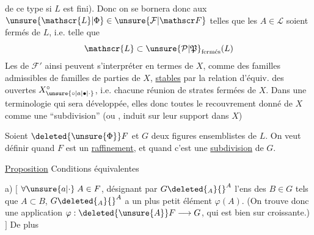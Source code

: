 de ce type si $L$ est fini). Donc on se bornera donc aux $\unsure{\mathscr{L}|\Phi}\in\unsure{\mathcal F|\mathscr F}$ telles que les $A\in\mathscr{L}$ soient fermés de $L$, i.e. telle que
\[ \mathscr{L}\subset\unsure{\mathcal P|\mathfrak P}_{\text{fermés}}(L) \]
Les  de $\mathcal F'$ ainsi  peuvent s'interpréter en termes de $X$, comme des familles admissibles  de familles de
parties  de $X$,  \uline{stables} par la relation d'équiv. des   ouvertes $X_{\unsure{\circ|a|\bullet|\cdot}}^\circ$, i.e. chacune réunion de strates fermées de $X$.
Dans une terminologie qui sera développée, elles  donc toutes le recouvrement donné de $X$ comme une ``subdivision''\unsure{;|,} (ou ,  induit sur leur support dans $X$)


Soient $\deleted{\unsure{\Phi}}F$ et $G$ deux figures ensemblistes de $L$. On veut définir quand $F$ est un \uline{raffinement}, et quand c'est une \uline{subdivision} de $G$.

\uline{Proposition} Conditions équivalentes

a) $[$ $\forall\unsure{a|\cdot}\;A\in F$, désignant par $G\deleted{{}_A}{}^A$ l'ens des $B\in G$ tels que $A\subset B$, $G\deleted{{}_A}{}^A$ a un plus petit
élément $\varphi(A)$. (On trouve donc une application $\varphi:\deleted{\unsure{A}}F\longrightarrow G$, qui est bien sur croissante.) $]$ De plus
